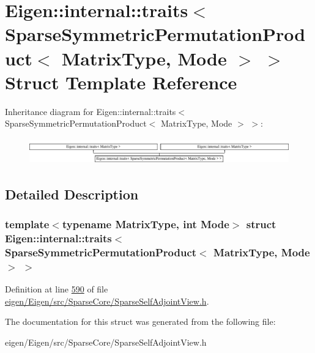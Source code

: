 \hypertarget{struct_eigen_1_1internal_1_1traits_3_01_sparse_symmetric_permutation_product_3_01_matrix_type_00_01_mode_01_4_01_4}{}\section{Eigen\+:\+:internal\+:\+:traits$<$ Sparse\+Symmetric\+Permutation\+Product$<$ Matrix\+Type, Mode $>$ $>$ Struct Template Reference}
\label{struct_eigen_1_1internal_1_1traits_3_01_sparse_symmetric_permutation_product_3_01_matrix_type_00_01_mode_01_4_01_4}
Inheritance diagram for Eigen\+:\+:internal\+:\+:traits$<$ Sparse\+Symmetric\+Permutation\+Product$<$ Matrix\+Type, Mode $>$ $>$\+:\begin{figure}[H]
\begin{center}
\leavevmode
\includegraphics[height=1.135903cm]{struct_eigen_1_1internal_1_1traits_3_01_sparse_symmetric_permutation_product_3_01_matrix_type_00_01_mode_01_4_01_4}
\end{center}
\end{figure}


\subsection{Detailed Description}
\subsubsection*{template$<$typename Matrix\+Type, int Mode$>$\newline
struct Eigen\+::internal\+::traits$<$ Sparse\+Symmetric\+Permutation\+Product$<$ Matrix\+Type, Mode $>$ $>$}



Definition at line \hyperlink{eigen_2_eigen_2src_2_sparse_core_2_sparse_self_adjoint_view_8h_source_l00590}{590} of file \hyperlink{eigen_2_eigen_2src_2_sparse_core_2_sparse_self_adjoint_view_8h_source}{eigen/\+Eigen/src/\+Sparse\+Core/\+Sparse\+Self\+Adjoint\+View.\+h}.



The documentation for this struct was generated from the following file\+:\begin{DoxyCompactItemize}
\item 
eigen/\+Eigen/src/\+Sparse\+Core/\+Sparse\+Self\+Adjoint\+View.\+h\end{DoxyCompactItemize}

